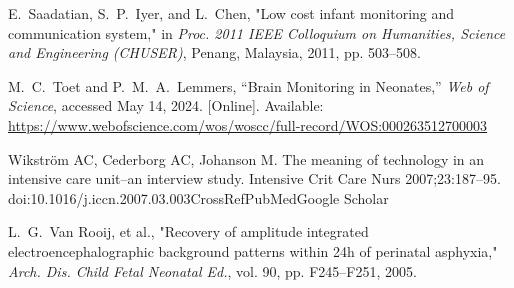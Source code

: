 \documentclass[12pt,journal,compsoc]{IEEEtran}
\begin{document}
\begin{thebibliography}{1}
E.~Saadatian, S.~P.~Iyer, and L.~Chen, "Low cost infant monitoring and communication system," in \emph{Proc. 2011 IEEE Colloquium on Humanities, Science and Engineering (CHUSER)}, Penang, Malaysia, 2011, pp. 503–508.

M.~C.~Toet and P.~M.~A.~Lemmers, “Brain Monitoring in Neonates,” \emph{Web of Science}, accessed May 14, 2024. [Online]. Available: \url{https://www.webofscience.com/wos/woscc/full-record/WOS:000263512700003}

Wikström AC, Cederborg AC, Johanson M. The meaning of technology in an intensive care unit--an interview study. Intensive Crit Care Nurs 2007;23:187–95. doi:10.1016/j.iccn.2007.03.003CrossRefPubMedGoogle Scholar

L.~G.~Van Rooij, et al., "Recovery of amplitude integrated electroencephalographic background patterns within 24h of perinatal asphyxia," \emph{Arch. Dis. Child Fetal Neonatal Ed.}, vol. 90, pp. F245–F251, 2005.

\end{thebibliography}
\end{document}
